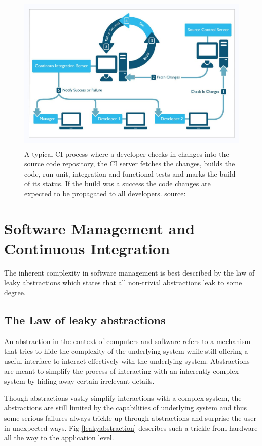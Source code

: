 \documentclass[12pt,conference]{IEEEtran}
\begin{document}
\begin{figure}[Ht!]
  \centering
  \includegraphics[height=3in]{ci_process}
  \caption{A typical CI process where a developer checks in changes into the source code repository, the CI server fetches the changes, builds the code, run unit, integration and functional tests and marks the build of its status. If the build was a success the code changes are expected to be propagated to all developers.   source: \cite{cois_continuous_2015}}
  \label{ci_process}
\end{figure}



\section*{Software Management and Continuous Integration}

The inherent complexity in software management is best described by the law of leaky abstractions \cite{spolsky_law_2002} which states that all non-trivial abstractions leak to some degree. 

\subsection*{The Law of leaky abstractions}

An abstraction in the context of computers and software refers to a mechanism that tries to hide the complexity of the underlying system while still offering a useful interface to interact effectively with the underlying system. Abstractions are meant to simplify the process of interacting with an inherently complex system by hiding away certain irrelevant details.

Though abstractions vastly simplify interactions with a complex system, the abstractions are still limited by the capabilities of underlying system and  thus some serious failures always trickle up through abstractions and surprise the user in unexpected ways. Fig \ref{leakyabstraction} describes such a trickle from hardware all the way to the application level.
\end{document}
